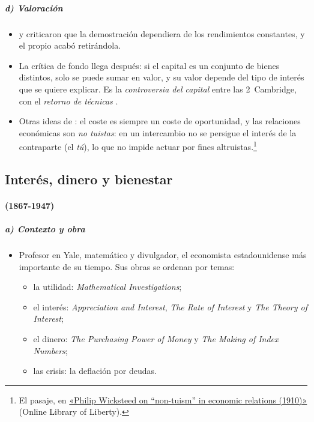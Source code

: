 \documentclass[11pt]{article}
\begin{document}
\subparagraph{d) Valoración}

\begin{itemize}
\item {} y  criticaron que la demostración dependiera de los rendimientos constantes, y el propio  acabó retirándola\nocite{Stigler1941Production}.
\item La crítica de fondo llega después: si el capital es un conjunto de bienes distintos, solo se puede sumar en valor, y su valor depende del tipo de interés que se quiere explicar. Es la \emph{controversia del capital} entre las 2~Cambridge, con el \emph{retorno de técnicas} .
\item Otras ideas de : el coste es siempre un coste de oportunidad, y las relaciones económicas son \emph{no tuistas}: en un intercambio no se persigue el interés de la contraparte (el \emph{tú}), lo que no impide actuar por fines altruistas\nocite{Wicksteed1910Common}.\footnote{El pasaje, en \href{https://oll.libertyfund.org/quotes/philip-wicksteed-on-non-tuism-in-economic-relations-1910}{«Philip Wicksteed on “non-tuism” in economic relations (1910)»} (Online Library of Liberty).}
\end{itemize}

\subsection{Interés, dinero y bienestar}\label{sec:interes}

\paragraph{ (1867-1947)}

\subparagraph{a) Contexto y obra}

\begin{itemize}
\item Profesor en Yale, matemático y divulgador, el economista estadounidense más importante de su tiempo. Sus obras se ordenan por temas:
  \begin{itemize}
  \item la utilidad: \emph{Mathematical Investigations}\nocite{Fisher1892Mathematical};
  \item el interés: \emph{Appreciation and Interest}\nocite{Fisher1896Appreciation}, \emph{The Rate of Interest}\nocite{Fisher1907Rate} y \emph{The Theory of Interest}\nocite{Fisher1930Theory};
  \item el dinero: \emph{The Purchasing Power of Money}\nocite{Fisher1911Purchasing} y \emph{The Making of Index Numbers}\nocite{Fisher1922Making};
  \item las crisis: la deflación por deudas\nocite{Fisher1933}.
  \end{itemize}
\end{itemize}
\end{document}
